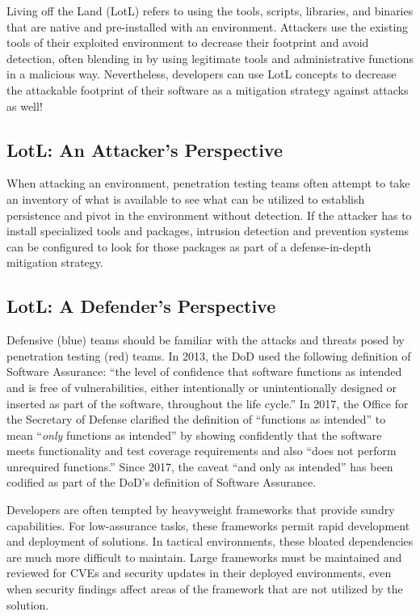 Living off the Land (LotL) refers to using the tools, scripts, libraries, and binaries that are native and pre-installed with an environment.\autocite[\pno~299]{20210621:rains2020cybersecurity} Attackers use the existing tools of their exploited environment to decrease their footprint and avoid detection, often blending in by using legitimate tools and administrative functions in a malicious way.\autocite[\pno~45]{20210621:calder2020cyber} Nevertheless, developers can use LotL concepts to decrease the attackable footprint of their software as a mitigation strategy against attacks as well!

\subsection{LotL: An Attacker's Perspective}

When attacking an environment, penetration testing teams often attempt to take an inventory of what is available to see what can be utilized to establish persistence and pivot in the environment without detection. If the attacker has to install specialized tools and packages, intrusion detection and prevention systems can be configured to look for those packages as part of a defense-in-depth mitigation strategy.

\subsection{LotL: A Defender's Perspective}

Defensive (blue) teams should be familiar with the attacks and threats posed by penetration testing (red) teams. In 2013, the DoD used the following definition of Software Assurance: ``the level of confidence that software functions as intended and is free of vulnerabilities, either intentionally or unintentionally designed or inserted as part of the software, throughout the life cycle.''\autocite[\pno~255 §933.e.2]{20210621:ndaa2013} In 2017, the Office for the Secretary of Defense clarified the definition of ``functions as intended'' to mean ``\textit{only} functions as intended'' by showing confidently that the software meets functionality and test coverage requirements and also ``does not perform unrequired functions.''\autocite[\pno~7]{20210621:marien2017} Since 2017, the caveat ``and only as intended'' has been codified as part of the DoD's definition of Software Assurance.\autocite[\pno~2]{20210621:hurt2017}

Developers are often tempted by heavyweight frameworks that provide sundry capabilities. For low-assurance tasks, these frameworks permit rapid development and deployment of solutions. In tactical environments, these bloated dependencies are much more difficult to maintain. Large frameworks must be maintained and reviewed for CVEs and security updates in their deployed environments, even when security findings affect areas of the framework that are not utilized by the solution.

